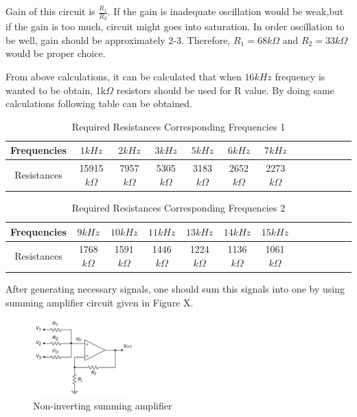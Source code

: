 \documentclass[letterpaper,12pt]{article}
\begin{document}
Gain of this circuit is \(\frac{R_1}{R_2}\). If the gain is inadequate oscillation would be weak,but if the gain is too much, circuit might goes into saturation. In order oscillation to be well, gain should be approximately 2-3. Therefore, \(R_1 = 68k\Omega\) and \(R_2 = 33k\Omega\) would be proper choice.

From above calculations, it can be calculated that when \(16kHz\) frequency is wanted to be obtain, 1k\(\Omega \) resistors should be used for R value. By doing same calculations following table can be obtained.
\begin{table}[H]
    \begin{center}
        \caption{Required Resistances Corresponding Frequencies 1}
        \vspace{2mm}
        \begin{tabular}{||c | c | c | c| c| c| c| c| c| c| c| c| c||} 
            \hline
            Frequencies &\(1kHz\) & \(2kHz\) & \(3kHz\)& \(5kHz\)& \(6kHz\)& \(7kHz\)\\ [0.5ex] 
            \hline\hline
            Resistances &15915\(k\Omega\) & 7957\(k\Omega\) & 5305\(k\Omega\)& 3183\(k\Omega\)& 2652\(k\Omega\)& 2273\(k\Omega\)\\
            \hline
        \end{tabular}
    \end{center}
\end{table}  
\begin{table}[H]
    \begin{center}
        \caption{Required Resistances Corresponding Frequencies 2}
        \vspace{2mm}
        \begin{tabular}{||c | c | c | c| c| c| c| c| c| c| c| c| c||} 
            \hline
            Frequencies &\(9kHz\)& \(10kHz\)& \(11kHz\)& \(13kHz\)& \(14kHz\)& \(15kHz\)\\ [0.5ex] 
            \hline\hline
            Resistances &1768\(k\Omega\)& 1591\(k\Omega\)& 1446\(k\Omega\)& 1224\(k\Omega\)& 1136\(k\Omega\)& 1061\(k\Omega\)\\
            \hline
        \end{tabular}
    \end{center}
\end{table}  

After generating necessary signals, one should sum this signals into one by using summing amplifier circuit given in Figure X. 
\begin{figure}[H]
    \centering
    \includegraphics[width = 0.35\textwidth]{Non-Inv-Sum-Amp.jpg}
    \caption{Non-inverting summing amplifier}
\end{figure} 
\end{document}
